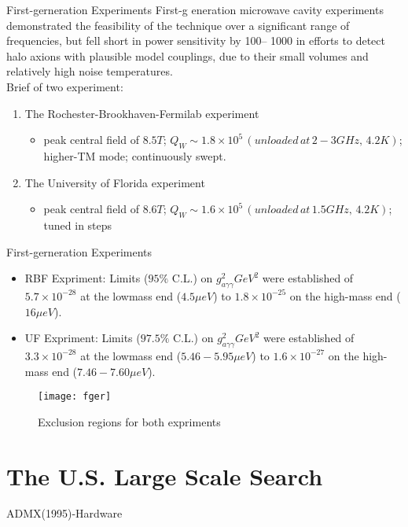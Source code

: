 \documentclass{beamer}
\begin{document}
\begin{frame}{First-gerneration Experiments}
First-g eneration microwave cavity experiments demonstrated the
feasibility of the technique over a significant range of
frequencies, but fell short in power sensitivity by 100–
1000 in efforts to detect halo axions with plausible model couplings, due to their \alert{small volumes}
and relatively \alert{high noise temperatures}.\\
Brief of two experiment:
\begin{enumerate}
\item The Rochester-Brookhaven-Fermilab experiment\\
\begin{itemize}
\item peak central field of $8.5T$; $Q_W \sim 1.8 \times 10^5 \,(unloaded\,at\,2-3GHz,\,4.2K)$; higher-TM mode; continuously swept.
\end{itemize}
\item The University of Florida experiment
\begin{itemize}
\item peak central field of $8.6T$; $Q_W \sim 1.6 \times 10^5 \,(unloaded\,at\,1.5GHz,\,4.2K)$; tuned in steps
\end{itemize}
\end{enumerate}
\end{frame}
\begin{frame}{First-gerneration Experiments}
\begin{itemize}
\item RBF Expriment: Limits ($95\%$ C.L.) on $g_{a\gamma\gamma}^2 GeV^2$
were established of $5.7 \times 10^{-28}$ at the lowmass end ($4.5\mu eV$) to $1.8\times10^{-25}$ on the high-mass end ($16\mu eV$).
\item UF Expriment: Limits ($97.5\%$ C.L.) on $g_{a\gamma\gamma}^2 GeV^2$
were established of $3.3 \times 10^{-28}$ at the lowmass end ($5.46-5.95\mu eV$) to $1.6\times10^{-27}$ on the high-mass end 
($7.46-7.60\mu eV$).
\end{itemize}
\begin{figure} 
    \centering
    \texttt{[image: fger]}
    \caption{Exclusion regions for both expriments}
\end{figure}
\end{frame}

\section{The U.S. Large Scale Search}
\begin{frame}{ADMX(1995)-Hardware}

\end{frame}
\end{document}
